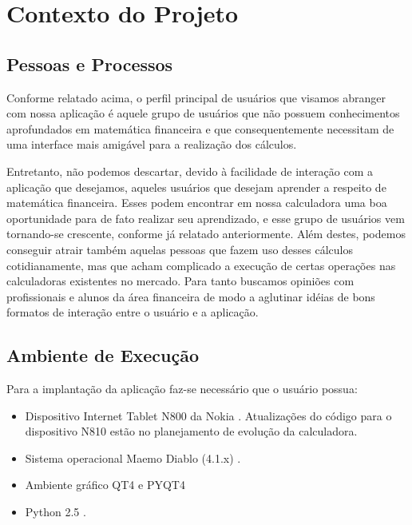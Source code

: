 \section{Contexto do Projeto}

\subsection{Pessoas e Processos}

Conforme relatado acima, o perfil principal de usuários que visamos abranger com nossa aplicação é aquele grupo de usuários que não possuem conhecimentos aprofundados em matemática financeira e que consequentemente necessitam de uma interface mais amigável para a realização dos cálculos.

Entretanto, não podemos descartar, devido à facilidade de interação com a aplicação que desejamos, aqueles usuários que desejam aprender a respeito de matemática financeira. Esses podem encontrar em nossa calculadora uma boa oportunidade para de fato realizar seu aprendizado, e esse grupo de usuários vem tornando-se crescente, conforme já relatado anteriormente. Além destes, podemos conseguir atrair também aquelas pessoas que fazem uso desses cálculos cotidianamente, mas que acham complicado a execução de certas operações nas calculadoras existentes no mercado. Para tanto buscamos opiniões com profissionais e alunos da área financeira de modo a aglutinar idéias de bons formatos de interação entre o usuário e a aplicação.


\subsection{Ambiente de Execução}


Para a implantação da aplicação faz-se necessário que o usuário possua:

\begin{itemize}
 \item Dispositivo Internet Tablet N800 da Nokia \cite{n800}. Atualizações do código para o dispositivo N810 estão no planejamento de evolução da calculadora.
 \item Sistema operacional Maemo Diablo (4.1.x) \cite{diablo}.
 \item Ambiente gráfico QT4 \cite{qt4} e PYQT4 \cite{pyqt4}
 \item Python 2.5 \cite{python}.
\end{itemize}

